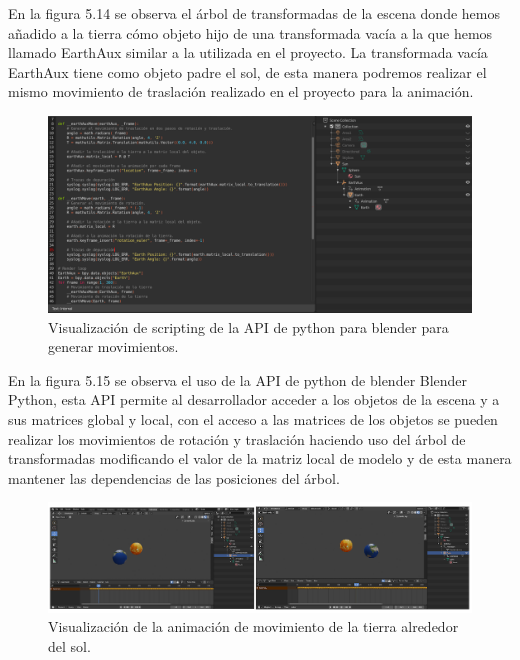 \documentclass[a4paper, 17pt]{book}
\begin{document}
En la figura 5.14 se observa el árbol de transformadas de la escena donde hemos añadido a la tierra cómo objeto hijo de una transformada
vacía a la que hemos llamado EarthAux similar a la utilizada en el proyecto. La transformada vacía EarthAux tiene como objeto padre el
sol, de esta manera podremos realizar el mismo movimiento de traslación realizado en el proyecto para la animación. 

\begin{figure}[H]
    \centering
    \includegraphics[scale=0.20, keepaspectratio]{img/Scripting.png}
    \caption{Visualización de scripting de la API de python para blender para generar movimientos.}
    \label{figura:materialesBlender}
\end{figure}

En la figura 5.15 se observa el uso de la API de python de blender Blender Python, esta API permite al desarrollador acceder a los objetos de la
escena y a sus matrices global y local, con el acceso a las matrices de los objetos se pueden realizar los movimientos de rotación y
traslación haciendo uso del árbol de transformadas modificando el valor de la matriz local de modelo y de esta manera mantener las
dependencias de las posiciones del árbol.

\begin{figure}[H]
    \centering
    \includegraphics[scale=0.45, keepaspectratio]{img/AnimationBlender.png}
    \caption{Visualización de la animación de movimiento de la tierra alrededor del sol.}
    \label{figura:materialesBlender}
\end{figure}
\end{document}
